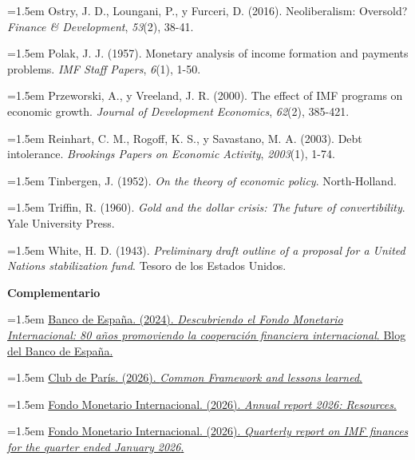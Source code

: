 \documentclass[10pt,a4paper]{article}
\begin{document}
\noindent\hangindent=1.5em Ostry, J. D., Loungani, P., y Furceri, D. (2016). Neoliberalism: Oversold? \textit{Finance \& Development}, \textit{53}(2), 38-41.

\noindent\hangindent=1.5em Polak, J. J. (1957). Monetary analysis of income formation and payments problems. \textit{IMF Staff Papers}, \textit{6}(1), 1-50.

\noindent\hangindent=1.5em Przeworski, A., y Vreeland, J. R. (2000). The effect of IMF programs on economic growth. \textit{Journal of Development Economics}, \textit{62}(2), 385-421.

\noindent\hangindent=1.5em Reinhart, C. M., Rogoff, K. S., y Savastano, M. A. (2003). Debt intolerance. \textit{Brookings Papers on Economic Activity}, \textit{2003}(1), 1-74.

\noindent\hangindent=1.5em Tinbergen, J. (1952). \textit{On the theory of economic policy}. North-Holland.

\noindent\hangindent=1.5em Triffin, R. (1960). \textit{Gold and the dollar crisis: The future of convertibility}. Yale University Press.

\noindent\hangindent=1.5em White, H. D. (1943). \textit{Preliminary draft outline of a proposal for a United Nations stabilization fund}. Tesoro de los Estados Unidos.

\vspace{0.8em}
\textbf{Complementario}


\noindent\hangindent=1.5em \href{https://www.bde.es/wbe/es/noticias-eventos/blog/descubriendo-el-fondo-monetario-internacional-ochenta-anos-promoviendo-la-cooperacion-financiera-internacional.html}{Banco de España. (2024). \textit{Descubriendo el Fondo Monetario Internacional: 80 años promoviendo la cooperación financiera internacional}. Blog del Banco de España.}

\noindent\hangindent=1.5em \href{https://clubdeparis.org/en/sites/clubdeparis/accueil/dettes-traitements/traitements/reechelonnement-et-annulations/cadre-commun-et-lecons-tirees.html}{Club de París. (2026). \textit{Common Framework and lessons learned}.}

\noindent\hangindent=1.5em \href{https://www.imf.org/annual-report/2026/who-we-are/resources/}{Fondo Monetario Internacional. (2026). \textit{Annual report 2026: Resources}.}

\noindent\hangindent=1.5em \href{https://www.imf.org/-/media/files/data/imf-finance/quarterly-financial-statements/2026/fy2026-q3-quarterly-report.pdf}{Fondo Monetario Internacional. (2026). \textit{Quarterly report on IMF finances for the quarter ended January 2026}.}
\end{document}
